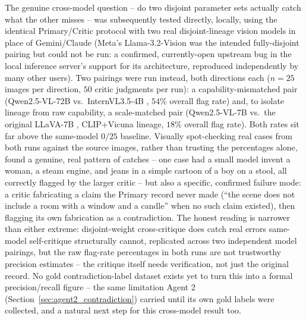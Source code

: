\documentclass[12pt,a4paper]{report}
\begin{document}
\begin{itemize}
    The genuine cross-model question -- do two disjoint parameter sets actually catch what the other misses -- was subsequently tested directly, locally, using the identical Primary/Critic protocol with two real disjoint-lineage vision models in place of Gemini/Claude (Meta's Llama-3.2-Vision \cite{llama3herd2024} was the intended fully-disjoint pairing but could not be run: a confirmed, currently-open upstream bug in the local inference server's support for its architecture, reproduced independently by many other users). Two pairings were run instead, both directions each ($n=25$ images per direction, $50$ critic judgments per run): a capability-mismatched pair (Qwen2.5-VL-72B \cite{qwen25vl2025} vs.\ InternVL3.5-4B \cite{internvl2024}, $54\%$ overall flag rate) and, to isolate lineage from raw capability, a scale-matched pair (Qwen2.5-VL-7B \cite{qwen25vl2025} vs.\ the original LLaVA-7B \cite{llava2023}, CLIP+Vicuna lineage, $18\%$ overall flag rate). Both rates sit far above the same-model $0/25$ baseline. Visually spot-checking real cases from both runs against the source images, rather than trusting the percentages alone, found a genuine, real pattern of catches -- one case had a small model invent a woman, a steam engine, and jeans in a simple cartoon of a boy on a stool, all correctly flagged by the larger critic -- but also a specific, confirmed failure mode: a critic fabricating a claim the Primary record never made (``the scene does not include a room with a window and a candle'' when no such claim existed), then flagging its own fabrication as a contradiction. The honest reading is narrower than either extreme: disjoint-weight cross-critique does catch real errors same-model self-critique structurally cannot, replicated across two independent model pairings, but the raw flag-rate percentages in both runs are not trustworthy precision estimates -- the critique itself needs verification, not just the original record. No gold contradiction-label dataset exists yet to turn this into a formal precision/recall figure -- the same limitation Agent 2 (Section~\ref{sec:agent2_contradiction}) carried until its own gold labels were collected, and a natural next step for this cross-model result too.


\end{itemize}
\end{document}
